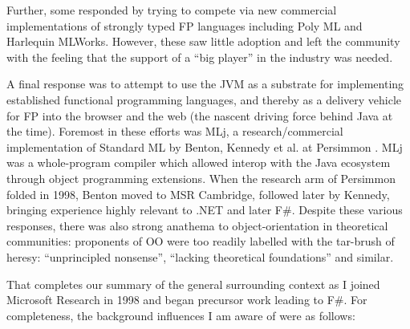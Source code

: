 \documentclass[acmsmall,screen]{acmart}
\begin{document}
Further, some responded by trying to compete via new commercial implementations of strongly typed FP languages including Poly ML and Harlequin MLWorks. However,
these saw little adoption and left the community with the feeling that the support of a “big player” in the industry was needed. 

A final response was to attempt to use the JVM as a substrate for implementing established functional programming languages, and thereby as a delivery
vehicle for FP into the browser and the web (the nascent driving force behind Java at the time).  Foremost in these efforts was MLj, a research/commercial
implementation of Standard ML by Benton, Kennedy et al. at Persimmon \citep{Benton1999}.  MLj was a whole-program compiler which allowed interop with the Java ecosystem through object programming extensions. When the research
arm of Persimmon folded in 1998, Benton moved to MSR Cambridge, followed later by Kennedy, bringing experience highly relevant to .NET and later F\#. Despite
these various responses, there was also strong anathema to object-orientation in theoretical communities: proponents of OO were too readily labelled with the
tar-brush of heresy: “unprincipled nonsense”, “lacking theoretical foundations” and similar.  

That completes our summary of the general surrounding context as I joined Microsoft Research in 1998 and began precursor work leading to F\#. For completeness,
the background influences I am aware of were as follows:
\end{document}
